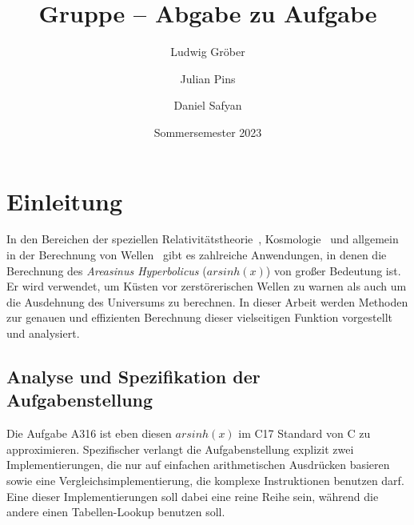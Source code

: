\documentclass[course=erap] {aspdoc}
\author{Ludwig Gröber \and Julian Pins \and Daniel Safyan}
\date{Sommersemester 2023} %
\title{Gruppe \theGroup{} -- Abgabe zu Aufgabe \theNumber}
\begin{document}
    \maketitle


    \section{Einleitung}
    In den Bereichen der speziellen Relativitätstheorie~\cite{relativity}, Kosmologie~\cite{universum1,universum2} und allgemein in der Berechnung von Wellen~\cite{linear_waves} gibt es zahlreiche Anwendungen, in denen die Berechnung des \textit{Areasinus Hyperbolicus} ($arsinh(x)$) von großer Bedeutung ist.
    Er wird verwendet, um Küsten vor zerstörerischen Wellen zu warnen als auch um die Ausdehnung des Universums zu berechnen.
    In dieser Arbeit werden Methoden zur genauen und effizienten Berechnung dieser vielseitigen Funktion vorgestellt und analysiert.
    

    \subsection{Analyse und Spezifikation der Aufgabenstellung}
    Die Aufgabe A316 ist eben diesen $arsinh(x)$ im C17 Standard von C zu approximieren.
    Spezifischer verlangt die Aufgabenstellung explizit zwei Implementierungen, die nur auf einfachen arithmetischen Ausdrücken basieren sowie eine Vergleichsimplementierung, die komplexe Instruktionen benutzen darf.
    Eine dieser Implementierungen soll dabei eine reine Reihe sein, während die andere einen Tabellen-Lookup benutzen soll.
\end{document}
